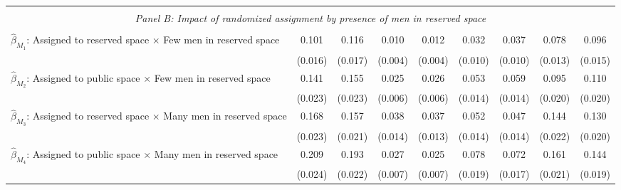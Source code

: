 \begin{tabular}{l*{8}{c}}
\hline \\[-1ex] \multicolumn{9}{c}{\textit{Panel B: Impact of randomized assignment by presence of men in reserved space}} \\\\[-1ex]
$\hat\beta_{M_1}$: Assigned to reserved space $\times$ Few men in reserved space&       0.101\sym{***}&       0.116\sym{***}&       0.010\sym{***}&       0.012\sym{***}&       0.032\sym{***}&       0.037\sym{***}&       0.078\sym{***}&       0.096\sym{***}\\
                    &     (0.016)         &     (0.017)         &     (0.004)         &     (0.004)         &     (0.010)         &     (0.010)         &     (0.013)         &     (0.015)         \\
[1em]
$\hat\beta_{M_2}$: Assigned to public space $\times$ Few men in reserved space&       0.141\sym{***}&       0.155\sym{***}&       0.025\sym{***}&       0.026\sym{***}&       0.053\sym{***}&       0.059\sym{***}&       0.095\sym{***}&       0.110\sym{***}\\
                    &     (0.023)         &     (0.023)         &     (0.006)         &     (0.006)         &     (0.014)         &     (0.014)         &     (0.020)         &     (0.020)         \\
[1em]
$\hat\beta_{M_3}$: Assigned to reserved space $\times$ Many men in reserved space&       0.168\sym{***}&       0.157\sym{***}&       0.038\sym{***}&       0.037\sym{***}&       0.052\sym{***}&       0.047\sym{***}&       0.144\sym{***}&       0.130\sym{***}\\
                    &     (0.023)         &     (0.021)         &     (0.014)         &     (0.013)         &     (0.014)         &     (0.014)         &     (0.022)         &     (0.020)         \\
[1em]
$\hat\beta_{M_4}$: Assigned to public space $\times$ Many men in reserved space&       0.209\sym{***}&       0.193\sym{***}&       0.027\sym{***}&       0.025\sym{***}&       0.078\sym{***}&       0.072\sym{***}&       0.161\sym{***}&       0.144\sym{***}\\
                    &     (0.024)         &     (0.022)         &     (0.007)         &     (0.007)         &     (0.019)         &     (0.017)         &     (0.021)         &     (0.019)         \\

\end{tabular}
